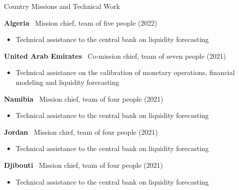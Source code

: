 \documentclass[usegeometry, 10pt, a4paper]{cv} %
\newcommand{\activite}[1]{\textbf{#1}\ }
\newcommand{\midreduce}{-0.5cm}
\begin{document}
\newpage

\begin{rubriquetableau}[0.95\textwidth]{Country Missions and Technical Work}\\
  \vspace{-0.5cm}

  \activite{Algeria} Mission chief, team of five people (2022)\\
  \vspace{\midreduce}
  \begin{itemize}[label={}]
  \item \small{Technical assistance to the central bank on liquidity forecasting}    
  \end{itemize}
  
  \activite{United Arab Emirates} Co-mission chief, team of seven people (2021)\\
  \vspace{\midreduce}
  \begin{itemize}[label={}]
    \item \small{Technical assistance on the calibration of monetary
        operations, financial modeling and liquidity forecasting}
  \end{itemize}

  \activite{Namibia} Mission chief, team of four people (2021) \\
  \vspace{\midreduce}
  \begin{itemize}[label={}]
    \item \small{Technical assistance to the central bank on liquidity forecasting}
  \end{itemize}

  \activite{Jordan} Mission chief, team of four people (2021)\\
  \vspace{\midreduce}
  \begin{itemize}[label={}]
    \item \small{Technical assistance to the central bank on liquidity forecasting}
  \end{itemize}
  
  \activite{Djibouti} Mission chief, team of four people (2021)\\
  \vspace{\midreduce}
  \begin{itemize}[label={}]
    \item \small{Technical assistance to the central bank on liquidity forecasting}
  \end{itemize}


\end{rubriquetableau}
\end{document}
